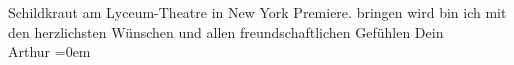 \begin{ledgroupsized}[t]{13cm}
{{{                            Schildkraut am Lyceum-Theatre in
                            New York Premiere.}}}\label{K_L02541_1h} bringen
                    wird bin ich mit den herzlichsten Wünschen und allen freundschaftlichen
                    Gefühlen\pend
           \pstart
           Dein{\\[\baselineskip]}\spacefill\mbox{Arthur}\pend
           \leftskip=0em{}          \endnumbering{}\end{ledgroupsized}  \newcommand{\dateiname}{L02541}\newcommand{\titel}{Arthur Schnitzler an Gabriel Beer-Hofmann, 14. 1. 1931}\newcommand{\editorInnen}{Martin Anton Müller und Gerd-Hermann Susen}
            \footnotesize
\begin{ledgroupsized}[t]{11.5cm}
\end{ledgroupsized}
         
      